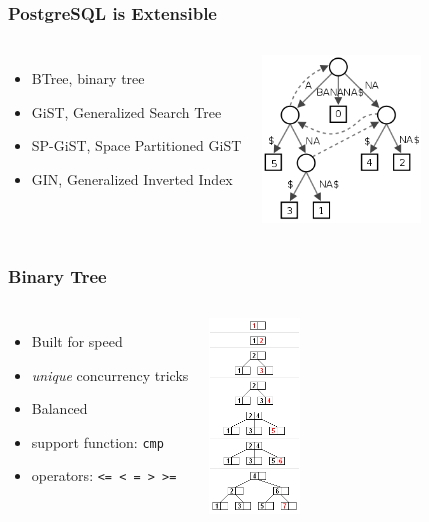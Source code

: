 \documentclass{beamer}
\begin{document}
\begin{frame}[fragile]
  \frametitle{PostgreSQL is Extensible}

  \vfill

\begin{columns}[c]

  \begin{itemize}
  \item BTree, binary tree
  \item GiST, Generalized Search Tree
  \item SP-GiST, Space Partitioned GiST
  \item GIN, Generalized Inverted Index
  \end{itemize}

\begin{center}
  \includegraphics[height=12em]{suffix-tree-banana.png}
\end{center}
\end{columns}
\end{frame}


\begin{frame}[fragile]
  \frametitle{Binary Tree}

  \vfill

\begin{columns}[c]

  \begin{itemize}
  \item Built for speed
  \item \textit{unique} concurrency tricks
  \item Balanced
  \item support function: \texttt{cmp}
  \item operators: \texttt{<= < = > >=}
  \end{itemize}

\begin{center}
  \includegraphics[height=14em]{B_tree_insertion_example.png}
\end{center}
\end{columns}
\end{frame}
\end{document}

